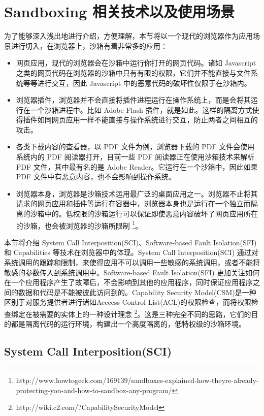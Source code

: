 \chapter{Sandboxing 相关技术以及使用场景}
\label{s:implementation}

为了能够深入浅出地进行介绍，方便理解，本节将以一个现代的浏览器作为应用场景进行切入，在浏览器上，沙箱有着非常多的应用：

\begin{itemize}
\item
网页应用，现代的浏览器会在沙箱中运行你打开的网页代码。诸如 Javascript 之类的网页代码在浏览器的沙箱中只有有限的权限，它们并不能直接与文件系统等等进行交互，因此 Javascript 中的恶意代码的破坏性仅限于在沙箱内。
\item
浏览器插件，浏览器并不会直接将插件进程运行在操作系统上，而是会将其运行在一个沙箱进程中。比如 Adobe Flash 插件，就是如此。这样的隔离方式使得插件如同网页应用一样不能直接与操作系统进行交互，防止两者之间相互的攻击。
\item
各类下载内容的查看器，以 PDF 文件为例，浏览器下载的 PDF 文件会使用系统内的 PDF 阅读器打开，目前一些 PDF 阅读器正在使用沙箱技术来解析 PDF 文件，其中最有名的是 Adobe Reader。它运行在一个沙箱中，因此如果 PDF 文件中有恶意内容，也不会影响到操作系统。
\item
浏览器本身，浏览器是沙箱技术运用最广泛的桌面应用之一。浏览器不止将其请求的网页应用和插件等运行在容器中，浏览器本身也是运行在一个独立而隔离的沙箱中的。低权限的沙箱运行可以保证即使恶意内容破坏了网页应用所在的沙箱，也会被浏览器的沙箱所限制 \footnote{http://www.howtogeek.com/169139/sandboxes-explained-how-theyre-already-protecting-you-and-how-to-sandbox-any-program/}。
\end{itemize}

本节将介绍 System Call Interposition(SCI)、Software-based Fault Isolation(SFI) 和 Capabilities 等技术在浏览器中的体现。System Call Interposition(SCI) 通过对系统调用的跟踪和限制，来使得应用不可以调用一些敏感的系统调用，或者不能将敏感的参数传入到系统调用中。Software-based Fault Isolation(SFI) 更加关注如何在一个应用程序产生了故障后，不会影响到其他的应用程序，同时保证应用程序之间的数据和代码是不能被彼此访问到的。Capability Security Model(CSM)是一种区别于对服务提供者进行诸如Acccess Control List(ACL)的权限检查，而将权限检查绑定在被需要的实体上的一种设计理念 \footnote{http://wiki.c2.com/?CapabilitySecurityModel}。这是三种完全不同的思路，它们的目的都是隔离代码的运行环境，构建出一个高度隔离的，低特权级的沙箱环境。

\section{System Call Interposition(SCI)}
\label{ss:sci}

